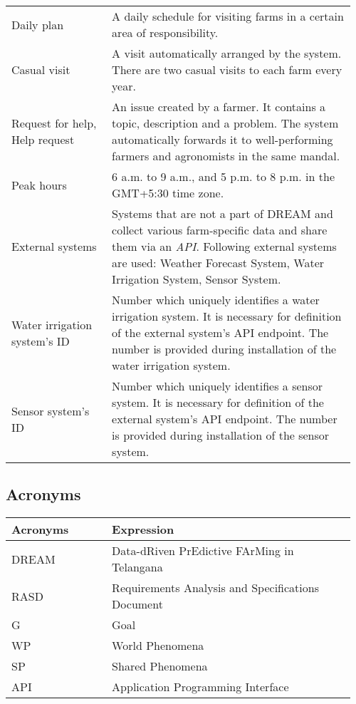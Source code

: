 \begin{center}
\begin{longtable}{@{}p{0.28\linewidth} p{0.68\linewidth}@{}}
        Daily plan              & A daily schedule for visiting farms in a certain area of responsibility.\\
        Casual visit            & A visit automatically arranged by the system. There are two casual visits to each farm every year.\\
        Request for help, Help request & An issue created by a farmer. It contains a topic, description and a problem. The system automatically forwards it to well-performing farmers and agronomists in the same mandal.\\
        Peak hours              & 6 a.m. to 9 a.m., and 5 p.m. to 8 p.m. in the GMT+5:30 time zone.\\
        External systems        & Systems that are not a part of DREAM and collect various farm-specific data and share them via an \textit{API}. Following external systems are used: Weather Forecast System, Water Irrigation System, Sensor System.\\
        Water irrigation system's ID    & Number which uniquely identifies a water irrigation system. It is necessary for definition of the external system's API endpoint. The number is provided during installation of the water irrigation system.  \\
        Sensor system's ID              & Number which uniquely identifies a sensor system. It is necessary for definition of the external system's API endpoint. The number is provided during installation of the sensor system. \\
	\end{longtable}
\end{center}

\subsection{Acronyms}

\begin{center}
	\begin{tabular}{@{}p{0.28\linewidth} p{0.68\linewidth}@{}}
		\toprule
		\textbf{Acronyms}   & \textbf{Expression}\\
		\midrule
		DREAM               & Data-dRiven PrEdictive FArMing in Telangana\\
		RASD                & Requirements Analysis and Specifications Document\\
		G                   & Goal\\
		WP                  & World Phenomena\\
		SP                  & Shared Phenomena\\
		API                 & Application Programming Interface\\
		\bottomrule
	\end{tabular}
\end{center}


